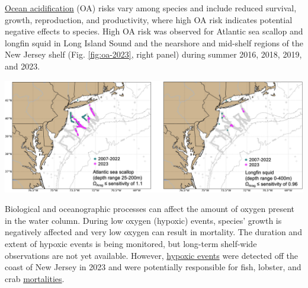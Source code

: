 \documentclass[
  10pt,
]{article}
\let\origfigure\figure
\let\endorigfigure\endfigure
\renewenvironment{figure}[1][2] {
    \expandafter\origfigure\expandafter[H]
} {
    \endorigfigure
}
\begin{document}
\href{https://noaa-edab.github.io/catalog/ocean-acidification-and-other-stressors.html}{Ocean acidification} (OA) risks vary among species and include reduced survival, growth, reproduction, and productivity, where high OA risk indicates potential negative effects to species. High OA risk was observed for Atlantic sea scallop and longfin squid in Long Island Sound and the nearshore and mid-shelf regions of the New Jersey shelf (Fig. \ref{fig:oa-2023}, right panel) during summer 2016, 2018, 2019, and 2023.

\begin{figure}

{\centering \includegraphics[width=40.19in]{SOE-NEFMC_files/figure-latex/oa-2023-1} 

}

\caption{Locations where bottom aragonite saturation state ($\Omega_{Arag}$; summer only: June-August) were at or below the laboratory-derived sensitivity level for Atlantic sea scallop (left panel) and longfin squid (right panel) for the time periods 2007-2022 (dark cyan) and 2023 only (magenta). Gray circles indicate locations where bottom $\Omega_{Arag}$ values were above the species specific sensitivity values.}\label{fig:oa-2023}
\end{figure}

Biological and oceanographic processes can affect the amount of oxygen present in the water column. During low oxygen (hypoxic) events, species' growth is negatively affected and very low oxygen can result in mortality. The duration and extent of hypoxic events is being monitored, but long-term shelf-wide observations are not yet available. However, \href{https://noaa-edab.github.io/catalog/observation-synthesis.html}{hypoxic events} were detected off the coast of New Jersey in 2023 and were potentially responsible for fish, lobster, and crab \href{https://sebsnjaesnews.rutgers.edu/2023/12/rutgers-scientists-observe-unusual-ocean-conditions-possibly-linked-to-mortality-in-marine-life-off-new-jersey/}{mortalities}.
\end{document}
